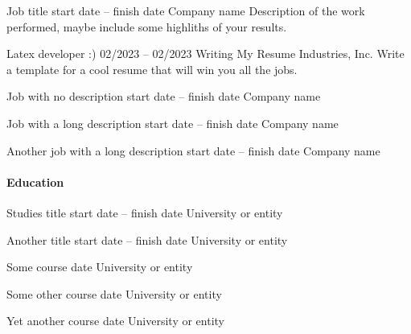 \documentclass[color]{resume-twopanels}
\begin{document}
\begin{resume}
\begin{rightpanel}
\begin{itemize}
                \resumeitem
                {Job title}
                {start date – finish date}
                {Company name}
                {Description of the work performed,
                maybe include some highliths of your results.}

                \resumeitem
                {Latex developer :)}
                {02/2023 – 02/2023}
                {Writing My Resume Industries, Inc.}
                {Write a template for a cool resume
                that will win you all the jobs.}

                \resumeitem
                {Job with no description}
                {start date – finish date}
                {Company name}
                {}%

                \resumeitem
                {Job with a long description}
                {start date – finish date}
                {Company name}
                {\lipsum[66]}

                \resumeitem
                {Another job with a long description}
                {start date – finish date}
                {Company name}
                {\lipsum[66]}
            \end{itemize}


        \paragraph{Education}

            \begin{itemize}

                \resumeitem
                {Studies title}
                {start date – finish date}
                {University or entity}
                {}

                \resumeitem
                {Another title}
                {start date – finish date}
                {University or entity}
                {}
                \vspace{1em}

                \resumeitem
                {Some course}
                {date}
                {University or entity}
                {}

                \resumeitem
                {Some other course}
                {date}
                {University or entity}
                {}

                \resumeitem
                {Yet another course}
                {date}
                {University or entity}
                {}
            \end{itemize}

    \end{rightpanel}
\end{resume}
\end{document}
